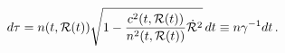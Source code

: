\begin{equation}\label{dtdtau}
d\tau = n(t,{\cal R}(t)) \sqrt{ 1- {{c^2(t,{\cal R}(t))}\over
{n^2(t,{\cal R}(t))} } \dot {\cal R}^2}\, dt \equiv n \gamma^{-1} dt \, .
\end{equation}


